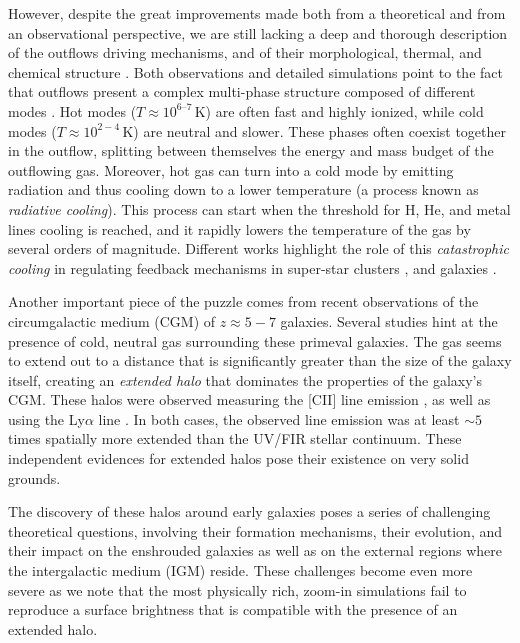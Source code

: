 \documentclass[12pt]{article}
\begin{document}
However, despite the great improvements made both from a theoretical and from an observational perspective, we are still lacking a deep and thorough description of the outflows driving mechanisms, and of their morphological, thermal, and chemical structure \citep{heckman2017galactic}. Both observations and detailed simulations point to the fact that outflows present a complex multi-phase structure composed of different modes \citep{murray2011, hopkins2014, muratov2015}. Hot modes ($T \approx 10^{6–7} \,\mathrm{K}$) are often fast and highly ionized, while cold modes ($T \approx 10^{2-4} \,\mathrm{K}$) are neutral and slower. These phases often coexist together in the outflow, splitting between themselves the energy and mass budget of the outflowing gas. Moreover, hot gas can turn into a cold mode by emitting radiation and thus cooling down to a lower temperature (a process known as \textit{radiative cooling}). This process can start when the threshold for H, He, and metal lines cooling is reached, and it rapidly lowers the temperature of the gas by several orders of magnitude. Different works highlight the role of this \textit{catastrophic cooling} in regulating feedback mechanisms in super-star clusters \citep{Silich:2004,gray2019catastrophic}, and galaxies \citep{Wang:1995, sarkar:2015, Thompson16, Schneider:2018, Gronke&Oh:2020}. 

Another important piece of the puzzle comes from recent observations of the circumgalactic medium (CGM) of $z\approx5-7$ galaxies. Several studies hint at the presence of cold, neutral gas surrounding these primeval galaxies. The gas seems to extend out to a distance that is significantly greater than the size of the galaxy itself, creating an \textit{extended halo} that dominates the properties of the galaxy's CGM. These halos were observed measuring the [CII] line emission \citep{Fujimoto19, Fujimoto:2020qzo, ginolfi:2019, herrera2021kiloparsec, cicone2015}, as well as using the Ly$\alpha$ line \citep{Wisotzki16, Wisotzki18, Kakuma19}. In both cases, the observed line emission was at least $\sim 5$ times spatially more extended than the UV/FIR stellar continuum. These independent evidences for extended halos pose their existence on very solid grounds.

The discovery of these halos around early galaxies poses a series of challenging theoretical questions, involving their formation mechanisms, their evolution, and their impact on the enshrouded galaxies as well as on the external regions where the intergalactic medium (IGM) reside. These challenges become even more severe as we note that the most physically rich, zoom-in simulations \citep{pallottini2017b, Arata:2019} fail to reproduce a surface brightness that is compatible with the presence of an extended halo. 
\end{document}
